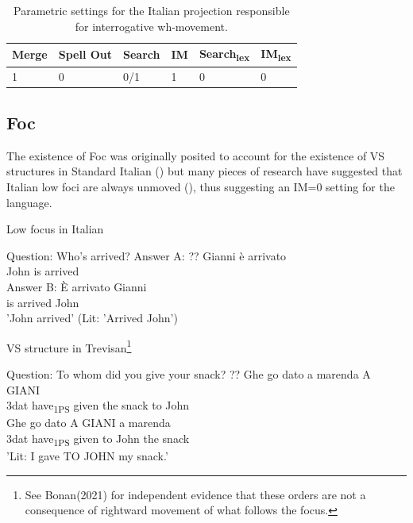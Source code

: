 \documentclass[fleqn,10pt]{wlscirep}
\begin{document}
\begin{table}[H]
    \centering
    \begin{tabular}{|l|l|l|l|l|l|}
    \hline
    Merge & Spell Out & Search & IM & Search\textsubscript{lex} & IM\textsubscript{lex} \\
    \hline
    1 & 0 & 0/1 & 1 & 0 & 0 \\
    \hline
    \end{tabular}
    \caption{\label{tab:samp}Parametric settings for the Italian projection responsible for interrogative wh-movement.}
\end{table}

\subsection*{Foc}

The existence of Foc was originally posited to account for the existence of VS structures in Standard Italian (\citealt{belletti2004}) but many pieces of research have suggested that Italian low foci are always unmoved (\citealt{cardinaletti2001,sameklodovici15,bonan21}), thus suggesting an IM=0 setting for the language. 

\begin{exe}
    \ex Low focus in Italian
    \begin{xlist}
    \ex Question: Who's arrived?
    \ex \gll Answer A: ?? Gianni è arrivato\\
    {} {} {} John is arrived\\
    \ex \gll Answer B: È arrivato Gianni\\
    {} {} is arrived John\\ 
    \glt \hspace{16mm} 'John arrived' (Lit: 'Arrived John')
    \end{xlist}
\end{exe}

\begin{exe}
    \ex VS structure in Trevisan\footnote{See Bonan(2021) for independent evidence that these orders are not a consequence of rightward movement of what follows the focus.}
        \begin{xlist}
            \ex Question: To whom did you give your snack?
            \ex \gll ?? Ghe go dato a marenda A GIANI\\
            {} 3dat have\textsubscript{1PS} given the snack to John\\
            \ex \gll Ghe go dato A GIANI a marenda\\
            3dat have\textsubscript{1PS} given to John the snack\\
            \glt 'Lit: I gave TO JOHN my snack.'
        \end{xlist}
\end{exe}
\end{document}
